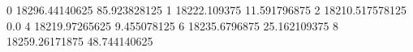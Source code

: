 0 18296.44140625 85.923828125
1 18222.109375 11.591796875
2 18210.517578125 0.0
4 18219.97265625 9.455078125
6 18235.6796875 25.162109375
8 18259.26171875 48.744140625
